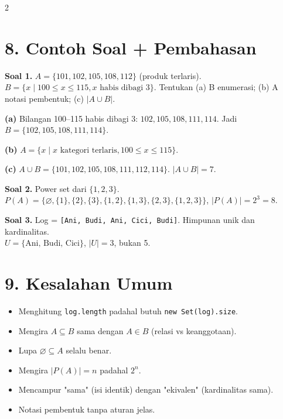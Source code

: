 \documentclass[9pt,a4paper]{extarticle}
\newcommand{\h}[1]{\textbf{#1}}
\begin{document}
\begin{multicols*}{2}
	\section*{8. Contoh Soal + Pembahasan}

	\h{Soal 1.} $A=\{101,102,105,108,112\}$ (produk terlaris). $B=\{x\mid 100\le x\le 115, x \text{ habis dibagi } 3\}$. Tentukan (a) B enumerasi; (b) A notasi pembentuk; (c) $|A\cup B|$.

	\h{(a)} Bilangan 100--115 habis dibagi 3: $102,105,108,111,114$. Jadi $B=\{102,105,108,111,114\}$.

	\h{(b)} $A=\{x\mid x \text{ kategori terlaris}, 100\le x\le 115\}$.

	\h{(c)} $A\cup B=\{101,102,105,108,111,112,114\}$. $|A\cup B|=7$.

	\h{Soal 2.} Power set dari $\{1,2,3\}$.\\
	$P(A)=\{\varnothing,\{1\},\{2\},\{3\},\{1,2\},\{1,3\},\{2,3\},\{1,2,3\}\}$, $|P(A)|=2^3=8$.

	\h{Soal 3.} Log = \texttt{[Ani, Budi, Ani, Cici, Budi]}. Himpunan unik dan kardinalitas.\\
	$U=\{\text{Ani, Budi, Cici}\}$, $|U|=3$, bukan 5.

	\section*{9. Kesalahan Umum}

	\begin{itemize}
		\item Menghitung \texttt{log.length} padahal butuh \texttt{new~Set(log).size}.
		\item Mengira $A\subseteq B$ sama dengan $A\in B$ (relasi vs keanggotaan).
		\item Lupa $\varnothing\subseteq A$ selalu benar.
		\item Mengira $|P(A)|=n$ padahal $2^n$.
		\item Mencampur "sama" (isi identik) dengan "ekivalen" (kardinalitas sama).
		\item Notasi pembentuk tanpa aturan jelas.
	\end{itemize}

\end{multicols*}
\end{document}
